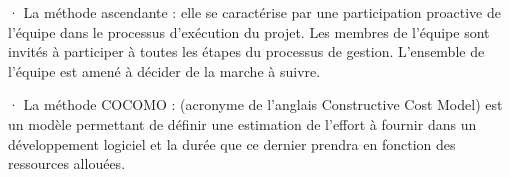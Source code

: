 ·   La méthode ascendante : elle se caractérise par une participation proactive de l'équipe dans le processus d'exécution du projet. Les membres de l'équipe sont invités à participer à toutes les étapes du processus de gestion. L'ensemble de l'équipe est amené à décider de la marche à suivre. 

\noindent

·   La méthode COCOMO : (acronyme de l'anglais Constructive Cost Model) est un modèle permettant de définir une estimation de l'effort à fournir dans un développement logiciel et la durée que ce dernier prendra en fonction des ressources allouées.

\noindent


%	


